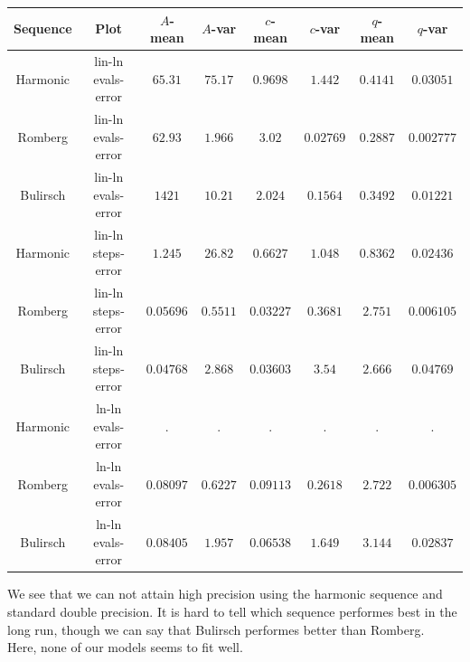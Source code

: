 \begin{table}[H]
    \centering
    \small
    \begin{tabular}{c|c||c|c|c|c|c	|c}
Sequence & Plot & \(A\)-mean & \(A\)-var & \(c\)-mean & \(c\)-var & \(q\)-mean & \(q\)-var\\\hline
Harmonic & lin-ln evals-error & \(65.31\) & \(75.17\) & \(0.9698\) & \(1.442\) & \(0.4141\) & \(0.03051\) \\
Romberg & lin-ln evals-error & \(62.93\) & \(1.966\) & \(3.02\) & \(0.02769\) & \(0.2887\) & \(0.002777\) \\
Bulirsch & lin-ln evals-error & \(1421\) & \(10.21\) & \(2.024\) & \(0.1564\) & \(0.3492\) & \(0.01221\) \\
Harmonic & lin-ln steps-error & \(1.245\) & \(26.82\) & \(0.6627\) & \(1.048\) & \(0.8362\) & \(0.02436\) \\
Romberg & lin-ln steps-error & \(0.05696\) & \(0.5511\) & \(0.03227\) & \(0.3681\) & \(2.751\) & \(0.006105\) \\
Bulirsch & lin-ln steps-error & \(0.04768\) & \(2.868\) & \(0.03603\) & \(3.54\) & \(2.666\) & \(0.04769\) \\
Harmonic & ln-ln evals-error & . & . & . & . & . & . \\
Romberg & ln-ln evals-error & \(0.08097\) & \(0.6227\) & \(0.09113\) & \(0.2618\) & \(2.722\) & \(0.006305\) \\
Bulirsch & ln-ln evals-error & \(0.08405\) & \(1.957\) & \(0.06538\) & \(1.649\) & \(3.144\) & \(0.02837\) \\
    \end{tabular}
    \label{tab:my_label}
\end{table}

We see that we can not attain high precision using the harmonic sequence and standard double precision. It is hard to tell which sequence performes best in the long run, though we can say that Bulirsch performes better than Romberg.\\

Here, none of our models seems to fit well. 

